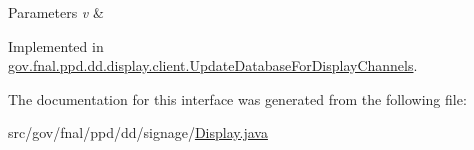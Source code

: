 \begin{DoxyParams}{Parameters}
{\em v} & \\
\hline
\end{DoxyParams}


Implemented in \hyperlink{classgov_1_1fnal_1_1ppd_1_1dd_1_1display_1_1client_1_1UpdateDatabaseForDisplayChannels_a20deb9f5431d716492d8af09ee38683d}{gov.\-fnal.\-ppd.\-dd.\-display.\-client.\-Update\-Database\-For\-Display\-Channels}.



The documentation for this interface was generated from the following file\-:\begin{DoxyCompactItemize}
\item 
src/gov/fnal/ppd/dd/signage/\hyperlink{Display_8java}{Display.\-java}\end{DoxyCompactItemize}
